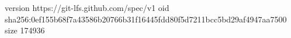 version https://git-lfs.github.com/spec/v1
oid sha256:0ef155b68f7a43586b20766b31f16445fdd80f5d7211bcc5bd29af4947aa7500
size 174936
